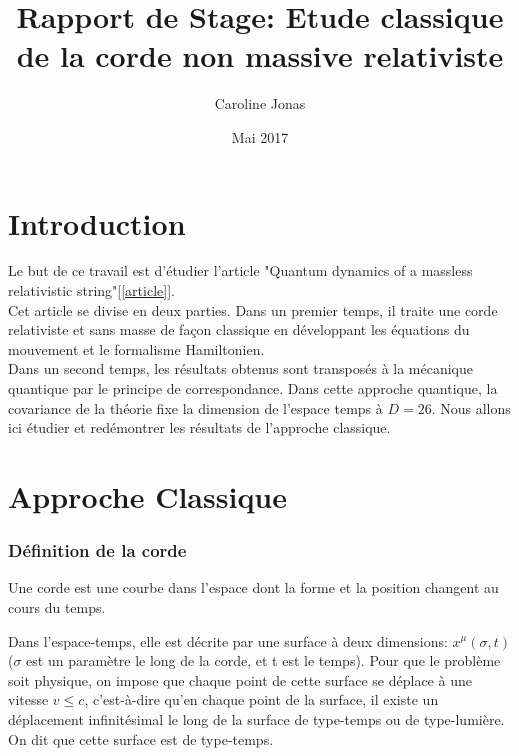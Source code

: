 \documentclass[a4paper,12pt]{article}
\title{Rapport de Stage: Etude classique de la corde non massive relativiste}
\author{Caroline Jonas}
\date{Mai 2017}
\begin{document}
\maketitle

\part*{Introduction}
Le but de ce travail est d'étudier l'article "Quantum dynamics of a massless relativistic string"[\ref{article}].\\
Cet article se divise en deux parties. Dans un premier temps, il traite une corde relativiste et sans masse de façon classique en développant les équations du mouvement et le formalisme Hamiltonien.\\
Dans un second temps, les résultats obtenus sont transposés à la mécanique quantique par le principe de correspondance. Dans cette approche quantique, la covariance de la théorie fixe la dimension de l'espace temps à $D=26$.
Nous allons ici étudier et redémontrer les résultats de l'approche classique.
 
\part*{Approche Classique}
\section{Définition de la corde}
Une corde est une courbe dans l'espace dont la forme et la position changent au cours du temps.

Dans l'espace-temps, elle est décrite par une surface à deux dimensions:
$x^{\mu}(\sigma,t)$ ($\sigma$ est un paramètre le long de la corde, et t est le temps).
Pour que le problème soit physique, on impose que chaque point de cette surface se déplace à une vitesse $v\leq c$, c'est-à-dire qu'en chaque point de la surface, il existe un déplacement infinitésimal le long de la surface de type-temps ou de type-lumière. On dit que cette surface est de type-temps.
\end{document}
